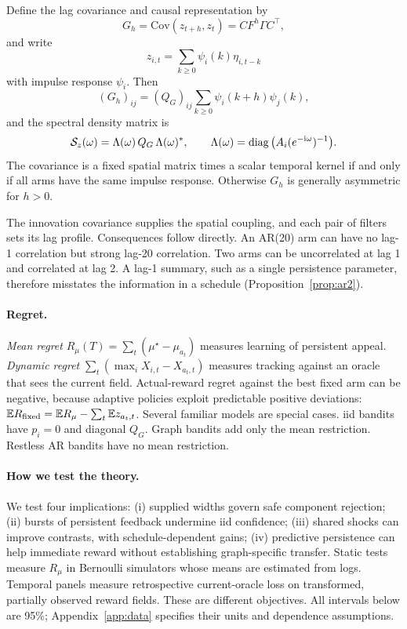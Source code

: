 \documentclass[sigconf,review,anonymous]{acmart}
\newcommand{\E}{\mathbb{E}}
\newcommand{\Cov}{\mathrm{Cov}}
\newcommand{\diag}{\operatorname{diag}}
\begin{document}
\begin{proposition}\label{prop:cov}
Define the lag covariance and causal representation by
\[G_h=\Cov(z_{t+h},z_t)=CF^h\Gamma C^\top,\]
and write
\[
z_{i,t}=\textstyle\sum_{k\ge0}\psi_i(k)\eta_{i,t-k}
\]
with impulse response $\psi_i$. Then
\[
(G_h)_{ij}=(Q_G)_{ij}\sum_{k\ge0}\psi_i(k+h)\psi_j(k),
\]
and the spectral density matrix is
\[
\mathcal S_z(\omega)=\Lambda(\omega)\,Q_G\,\Lambda(\omega)^*,\qquad \Lambda(\omega)=\diag\big(A_i(e^{-{\rm i}\omega})^{-1}\big).
\]
The covariance is a fixed spatial matrix times a scalar temporal kernel if and only if all arms have the same impulse response. Otherwise $G_h$ is generally asymmetric for $h>0$.
\end{proposition}

The innovation covariance supplies the spatial coupling, and each pair of filters sets its lag profile. Consequences follow directly. An AR(20) arm can have no lag-1 correlation but strong lag-20 correlation. Two arms can be uncorrelated at lag 1 and correlated at lag 2. A lag-1 summary, such as a single persistence parameter, therefore misstates the information in a schedule (Proposition~\ref{prop:ar2}).

\paragraph{Regret.} \emph{Mean regret} $R_\mu(T)=\sum_t(\mu^\star-\mu_{a_t})$ measures learning of persistent appeal. \emph{Dynamic regret} $\sum_t(\max_iX_{i,t}-X_{a_t,t})$ measures tracking against an oracle that sees the current field. Actual-reward regret against the best fixed arm can be negative, because adaptive policies exploit predictable positive deviations: $\E R_{\rm fixed}=\E R_\mu-\sum_t\E z_{a_t,t}$. Several familiar models are special cases. iid bandits have $p_i=0$ and diagonal $Q_G$. Graph bandits add only the mean restriction. Restless AR bandits have no mean restriction.

\paragraph{How we test the theory.} We test four implications: (i) supplied widths govern safe component rejection; (ii) bursts of persistent feedback undermine iid confidence; (iii) shared shocks can improve contrasts, with schedule-dependent gains; (iv) predictive persistence can help immediate reward without establishing graph-specific transfer. Static tests measure $R_\mu$ in Bernoulli simulators whose means are estimated from logs. Temporal panels measure retrospective current-oracle loss on transformed, partially observed reward fields. These are different objectives. All intervals below are 95\%; Appendix~\ref{app:data} specifies their units and dependence assumptions.
\end{document}
